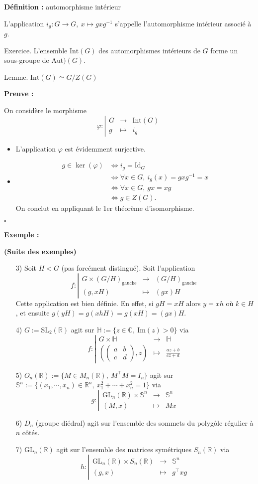 \documentclass{report}
\renewenvironment{leftbar}{%
  \def\FrameCommand{\vrule width 0.4pt \hspace{10pt}}%
  \MakeFramed {\advance\hsize-\width \FrameRestore}}%
 {\endMakeFramed}%
\newenvironment{definition}[1][]{
    \begin{tcolorbox}[colframe= white]
    \textbf{Définition :} 
    #1 \par
    }
    {\end{tcolorbox}}
\newenvironment{preuve}{\vspace*{0.5cm}
    \begin{leftbar}
    \noindent\textbf{Preuve :}\par}{
    \begin{flushright}
    $\square$
    \end{flushright}
    \end{leftbar}
}
\newenvironment{exemple}{\begin{tcolorbox}[colback=gray!10,colframe= white]
    \textbf{Exemple :}
     \par}
    {\end{tcolorbox}}
\newcommand{\ssi}{\Longleftrightarrow}
\newcommand{\R}{\mathbb{R}}
\newcommand{\C}{\mathbb{C}}
\newcommand{\D}{\right}
\newcommand{\G}{\left}
\newcommand{\fonctions}[5]{\begin{displaymath}#1:\left| \begin{array}{ccc}
 #2 & \longrightarrow & #3 \\
    #4 & \longmapsto & #5 \end{array}\right.\end{displaymath}}
\begin{document}
\par
\begin{definition}[automorphisme intérieur] 
L'application $i_g:G\longrightarrow  G,\ x\mapsto  gxg^{-1}$ s'appelle l'automorphisme intérieur associé à $g$. 
\end{definition}
\par
Exercice. L'ensemble $\text{Int}(G)$ des automorphismes intérieurs de $G$ forme un sous-groupe de $\text{Aut})(G)$. 
\par
Lemme. $\text{Int}(G)\simeq G/Z(G)$
\par
\begin{preuve}
On considère le morphisme 
\fonctions{\varphi}{G}{\text{Int}(G)}{g}{i_g}
\begin{itemize}
\item L'application $\varphi$ est évidemment surjective. 
\item 
\begin{align*}
g\in\ker(\varphi) &\ssi i_g=\text{Id}_G
\\ &\ssi \forall x\in G,\ i_g(x)=gxg^{-1}=x
\\ &\ssi \forall x\in G,\ gx=xg
\\ &\ssi g\in Z(G).
\end{align*}
On conclut en appliquant le 1er théorème d'isomorphisme.
\end{itemize}
\end{preuve}
\begin{exemple} \textbf{(Suite des exemples)}
\begin{itemize}
\item[3)] Soit $H<G$ (pas forcément distingué). Soit l'application 
\fonctions{f}{G\times (G/H)_{\text{gauche}}}{(G/H)_{\text{gauche}}}{(g,xH)}{(gx)H}
Cette application est bien définie. En effet, si $gH=xH$ alors $y=xh$ où $k\in H$, et ensuite $g(yH)=g(xhH)=g(xH)=(gx)H$. 
\item[4)] $G:=\text{SL}_2(\R)$ agit sur $\mathbb{H}:=\{z\in\C,\ \text{Im}(z)>0\}$ via 
\fonctions{f}{G\times \mathbb{H}}{\mathbb{H}}{\G(\begin{pmatrix}a&b\\ c&d\end{pmatrix} ,z\D)}{\frac{az+b}{cz+d}}
\item[5)] $O_n(\R):=\{M\in M_n(\R),\ M^\top M=I_n\}$ agit sur $\mathbb{S}^n:=\{(x_1,\cdots,x_n)\in\R^n,\ x_1^2+\cdots+x_n^2=1\}$ via 
\fonctions{g}{\text{GL}_n(\R)\times\mathbb{S}^n}{\mathbb{S}^n}{(M,x)}{Mx}
\item[6)] $D_n$ (groupe diédral) agit sur l'ensemble des sommets du polygôle régulier à $n$ côtés. 
\item[7)] $\text{GL}_n(\R)$ agit sur l'ensemble des matrices symétriques $S_n(\R)$ via 
\fonctions{h}{\text{GL}_n(\R)\times S_n(\R)}{\mathbb{S}^n}{(g,x)}{g^{\top}xg}
\end{itemize} 
\end{exemple}
\par
\end{document}
